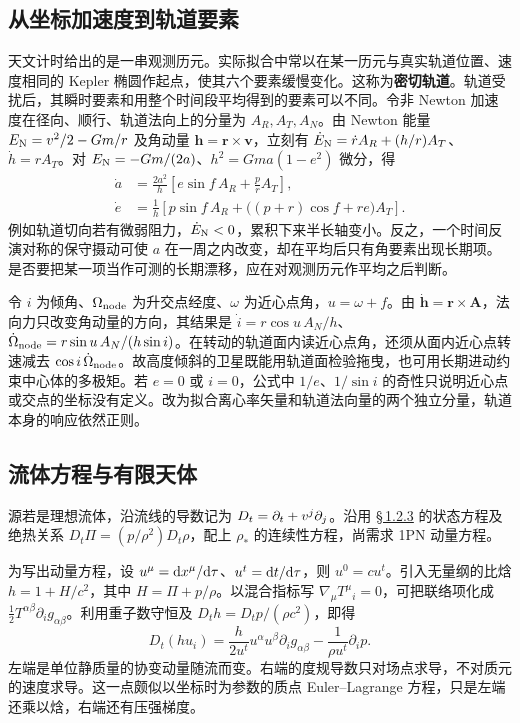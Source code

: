 \subsection{从坐标加速度到轨道要素}

天文计时给出的是一串观测历元。实际拟合中常以在某一历元与真实轨道位置、速度相同的 Kepler 椭圆作起点，使其六个要素缓慢变化。这称为\textbf{密切轨道}。轨道受扰后，其瞬时要素和用整个时间段平均得到的要素可以不同。令非 Newton 加速度在径向、顺行、轨道法向上的分量为 $A_R,A_T,A_N$。由 Newton 能量 $E_{\rm N}=v^2/2-Gm/r$ 及角动量 $\bm h=\bm r\times\bm v$，立刻有 $\dot E_{\rm N}=\dot r A_R+(h/r)A_T$、$\dot h=rA_T$。对 $E_{\rm N}=-Gm/(2a)$、$h^2=Gma(1-e^2)$ 微分，得
\begin{align*}
 \dot a&=\frac{2a^2}{h}\left[e\sin f\, A_R+\frac{p}{r}A_T\right],\\
 \dot e&=\frac1h\left[p\sin f\,A_R+
              \big((p+r)\cos f+re\big)A_T\right].
\end{align*}
例如轨道切向若有微弱阻力，$\dot E_{\rm N}<0$，累积下来半长轴变小。反之，一个时间反演对称的保守摄动可使 $a$ 在一周之内改变，却在平均后只有角要素出现长期项。是否要把某一项当作可测的长期漂移，应在对观测历元作平均之后判断。

令 $i$ 为倾角、$\Omega_{\rm node}$ 为升交点经度、$\omega$ 为近心点角，$u=\omega+f$。由 $\dot{\bm h}=\bm r\times\bm A$，法向力只改变角动量的方向，其结果是 $\dot i=r\cos u\,A_N/h$、$\dot\Omega_{\rm node}=r\sin u\,A_N/(h\sin i)$。在转动的轨道面内读近心点角，还须从面内近心点转速减去 $\cos i\,\dot\Omega_{\rm node}$。故高度倾斜的卫星既能用轨道面检验拖曳，也可用长期进动约束中心体的多极矩。若 $e=0$ 或 $i=0$，公式中 $1/e$、$1/\sin i$ 的奇性只说明近心点或交点的坐标没有定义。改为拟合离心率矢量和轨道法向量的两个独立分量，轨道本身的响应依然正则。

\subsection{流体方程与有限天体}\label{sec:pn-finite}

源若是理想流体，沿流线的导数记为 $D_t=\partial_t+v^j\partial_j$。沿用 \hyperlink{subsection.1.2.3}{\S\,1.2.3} 的状态方程及绝热关系 $D_t\Pi=(p/\rho^2)D_t\rho$，配上 $\rho_*$ 的连续性方程，尚需求 1PN 动量方程。

为写出动量方程，设 $u^\mu=\dd x^\mu/\dd\tau$、$u^t=\dd t/\dd\tau$，则 $u^0=cu^t$。引入无量纲的比焓 $h=1+H/c^2$，其中 $H=\Pi+p/\rho$。以混合指标写 $\nabla_\mu T^\mu{}_i=0$，可把联络项化成 $\tfrac12T^{\alpha\beta}\partial_i g_{\alpha\beta}$。利用重子数守恒及 $D_th=D_tp/(\rho c^2)$，即得
\[
  D_t(hu_i)=\frac{h}{2u^t}u^\alpha u^\beta\partial_i g_{\alpha\beta}
        -\frac{1}{\rho u^t}\partial_i p .
\]
左端是单位静质量的协变动量随流而变。右端的度规导数只对场点求导，不对质元的速度求导。这一点颇似以坐标时为参数的质点 Euler--Lagrange 方程，只是左端还乘以焓，右端还有压强梯度。

